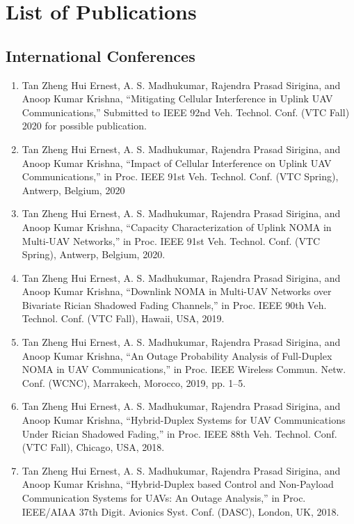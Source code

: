 \chapter* {List of Publications}

\section* {International Conferences}
\begin{enumerate}
		\item Tan Zheng Hui Ernest, A. S. Madhukumar, Rajendra Prasad Sirigina, and Anoop Kumar Krishna, “Mitigating Cellular Interference in Uplink UAV Communications,” Submitted to IEEE 92nd Veh. Technol. Conf. (VTC Fall) 2020 for possible publication.
    \item Tan Zheng Hui Ernest, A. S. Madhukumar, Rajendra Prasad Sirigina, and Anoop Kumar Krishna, “Impact of Cellular Interference on Uplink UAV Communications,” in Proc. IEEE 91st Veh. Technol. Conf. (VTC Spring), Antwerp, Belgium, 2020
		\item	Tan Zheng Hui Ernest, A. S. Madhukumar, Rajendra Prasad Sirigina, and Anoop Kumar Krishna, “Capacity Characterization of Uplink NOMA in Multi-UAV Networks,” in Proc. IEEE 91st Veh. Technol. Conf. (VTC Spring), Antwerp, Belgium, 2020.
		\item	Tan Zheng Hui Ernest, A. S. Madhukumar, Rajendra Prasad Sirigina, and Anoop Kumar Krishna, “Downlink NOMA in Multi-UAV Networks over Bivariate Rician Shadowed Fading Channels,” in Proc. IEEE 90th Veh. Technol. Conf. (VTC Fall), Hawaii, USA, 2019.
		\item	Tan Zheng Hui Ernest, A. S. Madhukumar, Rajendra Prasad Sirigina, and Anoop Kumar Krishna, “An Outage Probability Analysis of Full-Duplex NOMA in UAV Communications,” in Proc. IEEE Wireless Commun. Netw. Conf. (WCNC), Marrakech, Morocco, 2019, pp. 1–5.
		\item Tan Zheng Hui Ernest, A. S. Madhukumar, Rajendra Prasad Sirigina, and Anoop Kumar Krishna, “Hybrid-Duplex Systems for UAV Communications Under Rician Shadowed Fading,” in Proc. IEEE 88th Veh. Technol. Conf. (VTC Fall), Chicago, USA, 2018.
		\item	Tan Zheng Hui Ernest, A. S. Madhukumar, Rajendra Prasad Sirigina, and Anoop Kumar Krishna, “Hybrid-Duplex based Control and Non-Payload Communication Systems for UAVs: An Outage Analysis,” in Proc. IEEE/AIAA 37th Digit. Avionics Syst. Conf. (DASC), London, UK, 2018.

\end{enumerate}
